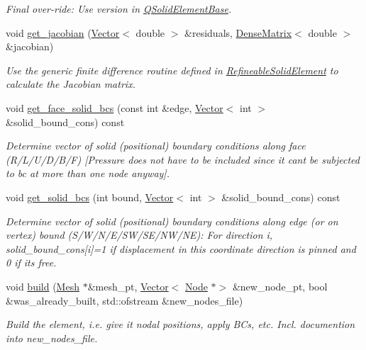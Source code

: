 \begin{DoxyCompactItemize}
\begin{DoxyCompactList}\small\item\em Final over-\/ride\+: Use version in \hyperlink{classoomph_1_1QSolidElementBase}{Q\+Solid\+Element\+Base}. \end{DoxyCompactList}\item 
void \hyperlink{classoomph_1_1RefineableSolidQElement_3_013_01_4_a305f594f84be7336b1bd63bc5c8f2d35}{get\+\_\+jacobian} (\hyperlink{classoomph_1_1Vector}{Vector}$<$ double $>$ \&residuals, \hyperlink{classoomph_1_1DenseMatrix}{Dense\+Matrix}$<$ double $>$ \&jacobian)
\begin{DoxyCompactList}\small\item\em Use the generic finite difference routine defined in \hyperlink{classoomph_1_1RefineableSolidElement}{Refineable\+Solid\+Element} to calculate the Jacobian matrix. \end{DoxyCompactList}\item 
void \hyperlink{classoomph_1_1RefineableSolidQElement_3_013_01_4_ac880a52e8224bd4798969c5c7b5fb540}{get\+\_\+face\+\_\+solid\+\_\+bcs} (const int \&edge, \hyperlink{classoomph_1_1Vector}{Vector}$<$ int $>$ \&solid\+\_\+bound\+\_\+cons) const
\begin{DoxyCompactList}\small\item\em Determine vector of solid (positional) boundary conditions along face (R/\+L/\+U/\+D/\+B/F) \mbox{[}Pressure does not have to be included since it can\textquotesingle{}t be subjected to bc at more than one node anyway\mbox{]}. \end{DoxyCompactList}\item 
void \hyperlink{classoomph_1_1RefineableSolidQElement_3_013_01_4_a57590ae1b7cb21cc362a371eef096217}{get\+\_\+solid\+\_\+bcs} (int bound, \hyperlink{classoomph_1_1Vector}{Vector}$<$ int $>$ \&solid\+\_\+bound\+\_\+cons) const
\begin{DoxyCompactList}\small\item\em Determine vector of solid (positional) boundary conditions along edge (or on vertex) bound (S/\+W/\+N/\+E/\+S\+W/\+S\+E/\+N\+W/\+NE)\+: For direction i, solid\+\_\+bound\+\_\+cons\mbox{[}i\mbox{]}=1 if displacement in this coordinate direction is pinned and 0 if it\textquotesingle{}s free. \end{DoxyCompactList}\item 
void \hyperlink{classoomph_1_1RefineableSolidQElement_3_013_01_4_a62db84d609d99537e4180bf897a81a9b}{build} (\hyperlink{classoomph_1_1Mesh}{Mesh} $\ast$\&mesh\+\_\+pt, \hyperlink{classoomph_1_1Vector}{Vector}$<$ \hyperlink{classoomph_1_1Node}{Node} $\ast$$>$ \&new\+\_\+node\+\_\+pt, bool \&was\+\_\+already\+\_\+built, std\+::ofstream \&new\+\_\+nodes\+\_\+file)
\begin{DoxyCompactList}\small\item\em Build the element, i.\+e. give it nodal positions, apply B\+Cs, etc. Incl. documention into new\+\_\+nodes\+\_\+file. \end{DoxyCompactList}\end{DoxyCompactItemize}
